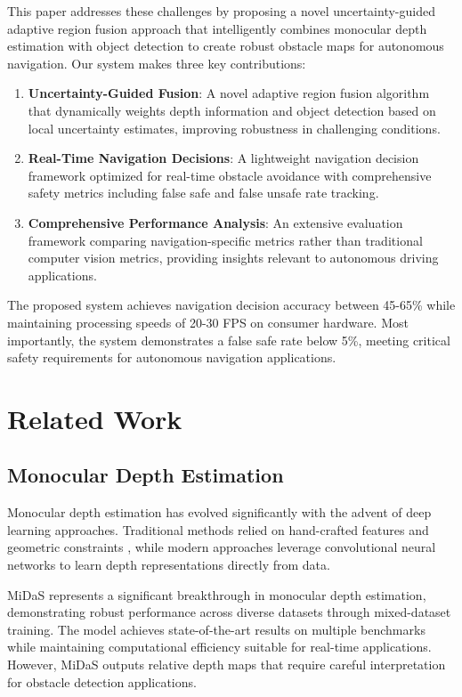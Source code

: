 \documentclass[10pt]{article}
\begin{document}
This paper addresses these challenges by proposing a novel uncertainty-guided adaptive region fusion approach that intelligently combines monocular depth estimation with object detection to create robust obstacle maps for autonomous navigation. Our system makes three key contributions:

\begin{enumerate}
\item \textbf{Uncertainty-Guided Fusion}: A novel adaptive region fusion algorithm that dynamically weights depth information and object detection based on local uncertainty estimates, improving robustness in challenging conditions.

\item \textbf{Real-Time Navigation Decisions}: A lightweight navigation decision framework optimized for real-time obstacle avoidance with comprehensive safety metrics including false safe and false unsafe rate tracking.

\item \textbf{Comprehensive Performance Analysis}: An extensive evaluation framework comparing navigation-specific metrics rather than traditional computer vision metrics, providing insights relevant to autonomous driving applications.
\end{enumerate}

The proposed system achieves navigation decision accuracy between 45-65\% while maintaining processing speeds of 20-30 FPS on consumer hardware. Most importantly, the system demonstrates a false safe rate below 5\%, meeting critical safety requirements for autonomous navigation applications.

\section{Related Work}

\subsection{Monocular Depth Estimation}

Monocular depth estimation has evolved significantly with the advent of deep learning approaches. Traditional methods relied on hand-crafted features and geometric constraints \cite{saxena2009make3d}, while modern approaches leverage convolutional neural networks to learn depth representations directly from data.

MiDaS \cite{ranftl2020towards} represents a significant breakthrough in monocular depth estimation, demonstrating robust performance across diverse datasets through mixed-dataset training. The model achieves state-of-the-art results on multiple benchmarks while maintaining computational efficiency suitable for real-time applications. However, MiDaS outputs relative depth maps that require careful interpretation for obstacle detection applications.
\end{document}
